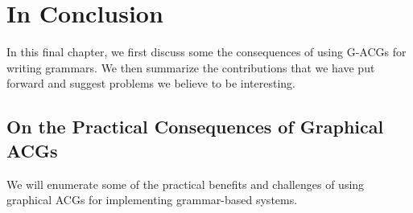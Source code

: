 \chapter{In Conclusion}
\label{chap:conclusion}

In this final chapter, we first discuss some the consequences of using
G-ACGs for writing grammars. We then summarize the contributions that we
have put forward and suggest problems we believe to be interesting.

\section{On the Practical Consequences of Graphical ACGs}
\label{sec:practical}

We will enumerate some of the practical benefits and challenges of using
graphical ACGs for implementing grammar-based systems.

